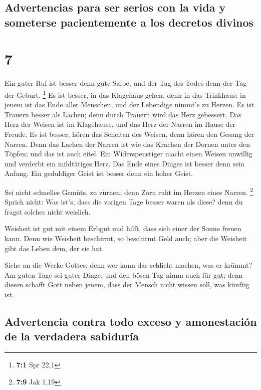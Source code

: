 \hypertarget{advertencias-para-ser-serios-con-la-vida-y-someterse-pacientemente-a-los-decretos-divinos}{%
\subsection{Advertencias para ser serios con la vida y someterse
pacientemente a los decretos
divinos}\label{advertencias-para-ser-serios-con-la-vida-y-someterse-pacientemente-a-los-decretos-divinos}}

\hypertarget{section-6}{%
\section{7}\label{section-6}}

 Ein guter Ruf ist besser denn gute Salbe, und der Tag des
Todes denn der Tag der Geburt. \footnote{\textbf{7:1} Spr 22,1}
 Es ist besser, in das Klagehaus gehen, denn in das
Trinkhaus; in jenem ist das Ende aller Menschen, und der Lebendige
nimmt's zu Herzen.  Es ist Trauern besser als Lachen; denn
durch Trauern wird das Herz gebessert.  Das Herz der
Weisen ist im Klagehause, und das Herz der Narren im Hause der Freude.
 Es ist besser, hören das Schelten des Weisen, denn hören
den Gesang der Narren.  Denn das Lachen der Narren ist wie
das Krachen der Dornen unter den Töpfen; und das ist auch eitel.
 Ein Widerspenstiger macht einen Weisen unwillig und
verderbt ein mildtätiges Herz.  Das Ende eines Dinges ist
besser denn sein Anfang. Ein geduldiger Geist ist besser denn ein hoher
Geist.

 Sei nicht schnelles Gemüts, zu zürnen; denn Zorn ruht im
Herzen eines Narren. \footnote{\textbf{7:9} Jak 1,19} 
Sprich nicht: Was ist's, dass die vorigen Tage besser waren als diese?
denn du fragst solches nicht weislich.

 Weisheit ist gut mit einem Erbgut und hilft, dass sich
einer der Sonne freuen kann.  Denn wie Weisheit
beschirmt, so beschirmt Geld auch; aber die Weisheit gibt das Leben dem,
der sie hat.

 Siehe an die Werke Gottes; denn wer kann das schlicht
machen, was er krümmt?  Am guten Tage sei guter Dinge,
und den bösen Tag nimm auch für gut; denn diesen schafft Gott neben
jenem, dass der Mensch nicht wissen soll, was künftig ist.

\hypertarget{advertencia-contra-todo-exceso-y-amonestaciuxf3n-de-la-verdadera-sabiduruxeda}{%
\subsection{Advertencia contra todo exceso y amonestación de la
verdadera
sabiduría}\label{advertencia-contra-todo-exceso-y-amonestaciuxf3n-de-la-verdadera-sabiduruxeda}}

